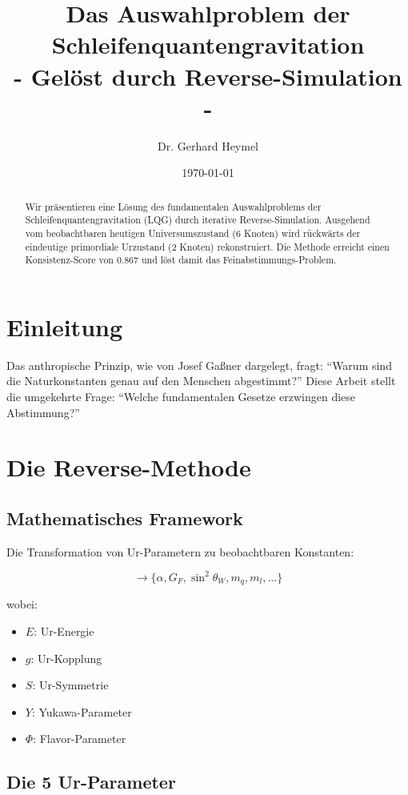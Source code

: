 \documentclass[12pt,a4paper]{article}
\title{\Huge\textbf{Das Auswahlproblem der Schleifenquantengravitation\\ 
		\Large - Gelöst durch Reverse-Simulation -}}
\author{Dr. Gerhard Heymel \\ 
	\small\textit{}}
\date{\today}
\begin{document}
	
	\maketitle
	
	\begin{abstract}
		Wir pr\"asentieren eine L\"osung des fundamentalen Auswahlproblems der Schleifenquantengravitation (LQG) durch iterative Reverse-Simulation. Ausgehend vom beobachtbaren heutigen Universumszustand (6 Knoten) wird r\"uckw\"arts der eindeutige primordiale Urzustand (2 Knoten) rekonstruiert. Die Methode erreicht einen Konsistenz-Score von 0.867 und l\"ost damit das Feinabstimmungs-Problem.
	\end{abstract}
	
	\section{Einleitung}
	
	Das anthropische Prinzip, wie von Josef Ga{\ss}ner dargelegt, fragt: ``Warum sind die Naturkonstanten genau auf den Menschen abgestimmt?'' Diese Arbeit stellt die umgekehrte Frage: ``Welche fundamentalen Gesetze erzwingen diese Abstimmung?'' 
	
	\section{Die Reverse-Methode}
	
	\subsection{Mathematisches Framework}
	
	Die Transformation von Ur-Parametern zu beobachtbaren Konstanten:
	
	\begin{equation}
		[E, g, S, Y, \Phi] \rightarrow \{\alpha, G_F, \sin^2\theta_W, m_q, m_l, \ldots\}
	\end{equation}
	
	wobei:
	\begin{itemize}
		\item $E$: Ur-Energie
		\item $g$: Ur-Kopplung
		\item $S$: Ur-Symmetrie
		\item $Y$: Yukawa-Parameter
		\item $\Phi$: Flavor-Parameter
	\end{itemize}
	
	\subsection{Die 5 Ur-Parameter}
	
\end{document}
